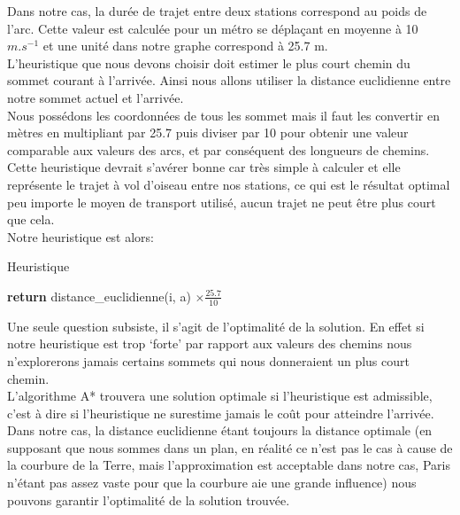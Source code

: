 \documentclass{article}
\begin{document}
Dans notre cas, la durée de trajet entre deux stations correspond au poids de l'arc. Cette valeur
est calculée pour un métro se déplaçant en moyenne à 10 $m.s^{-1}$ et une unité dans notre graphe
correspond à 25.7 m.\\

L'heuristique que nous devons choisir doit estimer le plus court chemin du sommet courant à l'arrivée.
Ainsi nous allons utiliser la distance euclidienne entre notre sommet actuel et l'arrivée.\\
Nous possédons les coordonnées de tous les sommet mais il faut les convertir en mètres en multipliant
par 25.7 puis diviser par 10 pour obtenir une valeur comparable aux valeurs des arcs, et par 
conséquent des longueurs de chemins.\\
Cette heuristique devrait s'avérer bonne car très simple à calculer et elle représente le trajet à
vol d'oiseau entre nos stations, ce qui est le résultat optimal peu importe le moyen de transport
utilisé, aucun trajet ne peut être plus court que cela.\\

Notre heuristique est alors:

\begin{algorithm}
\caption{Heuristique}\label{heuristique}
\begin{algorithmic}[1]
 
	\State \textbf{return} distance\_euclidienne(i, a) $\times \frac{25.7}{10}$
\EndProcedure
\end{algorithmic}
\end{algorithm}

Une seule question subsiste, il s'agit de l'optimalité de la solution. En effet si notre heuristique
est trop `forte' par rapport aux valeurs des chemins nous n'explorerons jamais certains sommets
qui nous donneraient un plus court chemin.\\
L'algorithme A* trouvera une solution optimale si l'heuristique est admissible, c'est à dire si
l'heuristique ne surestime jamais le coût pour atteindre l'arrivée.\\
Dans notre cas, la distance euclidienne étant toujours la distance optimale (en supposant que nous sommes
dans un plan, en réalité ce n'est pas le cas à cause de la courbure de la Terre, mais l'approximation
est acceptable dans notre cas, Paris n'étant pas assez vaste pour que la courbure aie une grande influence)
nous pouvons garantir l'optimalité de la solution trouvée.\\\\
\end{document}
